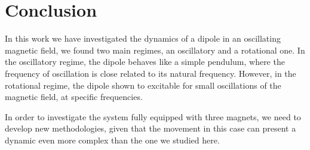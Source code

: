\section{Conclusion}

In this work we have investigated the dynamics of a dipole in an oscillating magnetic field, we found two main regimes, an oscillatory and a rotational one. In the oscillatory regime, the dipole behaves like a simple pendulum, where the frequency of oscillation is close related to it\textquotesingle s natural frequency. However, in the rotational regime, the dipole shown to excitable for small oscillations of the magnetic field, at specific frequencies. 

In order to investigate the system fully equipped with three magnets, we need to develop new methodologies, given that the movement in this case can present a dynamic even more complex than the one we studied here. 